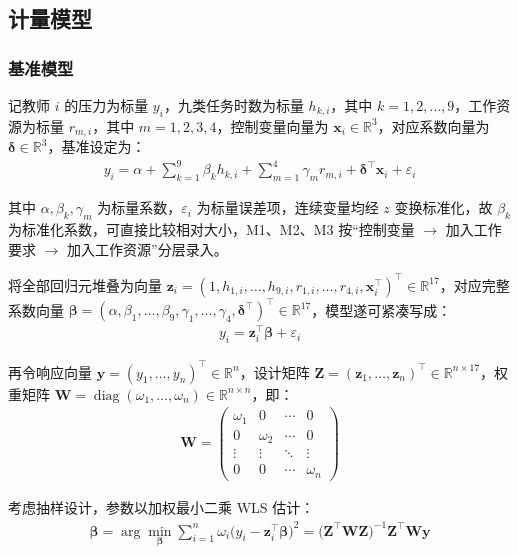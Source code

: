 \documentclass[zihao = -4, linespread = 1.5]{article}
\begin{document}
\subsection{计量模型}
\subsubsection{基准模型}
记教师 $i$ 的压力为标量 $y_i$，九类任务时数为标量 $h_{k,i}$，其中 $k=1,2,\ldots,9$，工作资源为标量 $r_{m,i}$，其中 $m=1,2,3,4$，控制变量向量为 $\bm{x}_i\in\mathbb{R}^{3}$，对应系数向量为 $\bm{\delta}\in\mathbb{R}^{3}$，基准设定为：
\begin{align}
    y_i=\alpha+\sum_{k=1}^{9}\beta_k h_{k,i}+\sum_{m=1}^{4}\gamma_m r_{m,i}+\bm{\delta}^{\top}\bm{x}_i+\varepsilon_i
\end{align}

其中 $\alpha,\beta_k,\gamma_m$ 为标量系数，$\varepsilon_i$ 为标量误差项，连续变量均经 $z$ 变换标准化，故 $\beta_k$ 为标准化系数，可直接比较相对大小，M1、M2、M3 按“控制变量 $\rightarrow$ 加入工作要求 $\rightarrow$ 加入工作资源”分层录入。

将全部回归元堆叠为向量 $\bm{z}_i=(1,h_{1,i},\ldots,h_{9,i},r_{1,i},\ldots,r_{4,i},\bm{x}_i^{\top})^{\top}\in\mathbb{R}^{17}$，对应完整系数向量 $\bm{\beta}=(\alpha,\beta_1,\ldots,\beta_9,\gamma_1,\ldots,\gamma_4,\bm{\delta}^{\top})^{\top}\in\mathbb{R}^{17}$，模型遂可紧凑写成：
\begin{align}
    y_i=\bm{z}_i^{\top}\bm{\beta}+\varepsilon_i
\end{align}

再令响应向量 $\bm{y}=(y_1,\ldots,y_n)^{\top}\in\mathbb{R}^{n}$，设计矩阵 $\bm{Z}=(\bm{z}_1,\ldots,\bm{z}_n)^{\top}\in\mathbb{R}^{n\times 17}$，权重矩阵 $\bm{W}=\operatorname{diag}(\omega_1,\ldots,\omega_n)\in\mathbb{R}^{n\times n}$，即：
\begin{align}
    \bm{W}=\begin{pmatrix}
        \omega_1 & 0 & \cdots & 0 \\
        0 & \omega_2 & \cdots & 0 \\
        \vdots & \vdots & \ddots & \vdots \\
        0 & 0 & \cdots & \omega_n
    \end{pmatrix}
\end{align}

考虑抽样设计，参数以加权最小二乘 WLS 估计：
\begin{align}
    \hat{\bm{\beta}}=\arg\min_{\bm{\beta}}\sum_{i=1}^{n}\omega_i\bigl(y_i-\bm{z}_i^{\top}\bm{\beta}\bigr)^2=\bigl(\bm{Z}^{\top}\bm{W}\bm{Z}\bigr)^{-1}\bm{Z}^{\top}\bm{W}\bm{y}
\end{align}
\end{document}
